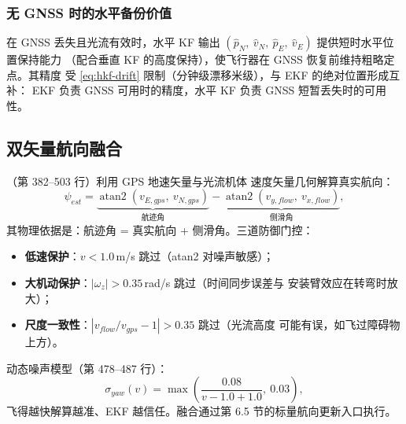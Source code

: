 \subsubsection{无 GNSS 时的水平备份价值}

在 GNSS 丢失且光流有效时，水平 KF 输出
$(\hat p_N,\ \hat v_N,\ \hat p_E,\ \hat v_E)$ 提供短时水平位置保持能力
（配合垂直 KF 的高度保持），使飞行器在 GNSS 恢复前维持粗略定点。其精度
受 \cref{eq:hkf-drift} 限制（分钟级漂移米级），与 EKF 的绝对位置形成互补：
EKF 负责 GNSS 可用时的精度，水平 KF 负责 GNSS 短暂丢失时的可用性。

\subsection{双矢量航向融合}

（第 382--503 行）利用 GPS 地速矢量与光流机体
速度矢量几何解算真实航向：
\begin{equation}
  \psi_{est} = \underbrace{\operatorname{atan2}(v_{E,gps},\ v_{N,gps})}_{\text{航迹角}}
    - \underbrace{\operatorname{atan2}(v_{y,flow},\ v_{x,flow})}_{\text{侧滑角}},
  \label{eq:dual-vector-yaw}
\end{equation}
其物理依据是：航迹角 = 真实航向 + 侧滑角。三道防御门控：
\begin{itemize}
  \item \textbf{低速保护}：$v < 1.0$\,m/s 跳过（atan2 对噪声敏感）；
  \item \textbf{大机动保护}：$|\omega_z| > 0.35$\,rad/s 跳过（时间同步误差与
    安装臂效应在转弯时放大）；
  \item \textbf{尺度一致性}：$|v_{flow}/v_{gps} - 1| > 0.35$ 跳过（光流高度
    可能有误，如飞过障碍物上方）。
\end{itemize}
动态噪声模型（第 478--487 行）：
\begin{equation}
  \sigma_{yaw}(v) = \max\left(\frac{0.08}{v - 1.0 + 1.0},\ 0.03\right),
  \label{eq:yaw-dyn-noise}
\end{equation}
飞得越快解算越准、EKF 越信任。融合通过第 6.5 节的标量航向更新入口执行。
